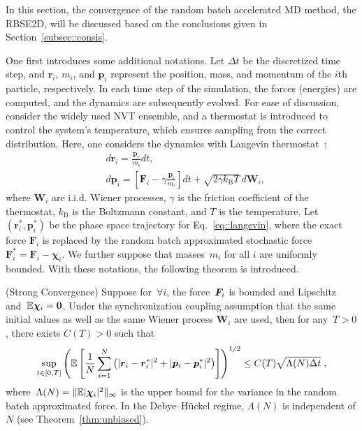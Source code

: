 In this section, the convergence of the random batch accelerated MD method, the RBSE2D, will be discussed based on the conclusions given in Section~\ref{subsec::consis}.

One first introduces some additional notations.
Let $\Delta t$ be the discretized time step, and $\bm{r}_i$, $m_i$, and $\bm{p}_i$ represent the position, mass, and momentum of the $i$th particle, respectively. 
In each time step of the simulation, the forces (energies) are computed, and the dynamics are subsequently evolved. 
For ease of discussion, consider the widely used NVT ensemble, and a thermostat is introduced to control the system's temperature, which ensures sampling from the correct distribution. 
Here, one considers the dynamics with Langevin thermostat~\cite{frenkel2023understanding}:
\begin{equation}\label{eq::langevin}
	\begin{split}
		& d \boldsymbol{r}_i = \frac{\boldsymbol{p}_i}{m_i} d t, \\ 
		& d \boldsymbol{p}_i = \left[\boldsymbol{F}_i - \gamma \frac{\boldsymbol{p}_i}{m_i}\right] d t + \sqrt{2 \gamma k_{\mathrm{B}} T} \, d \boldsymbol{W}_i,
	\end{split}
\end{equation}
where $\boldsymbol{W}_i$ are i.i.d. Wiener processes, $\gamma$ is the friction coefficient of the thermostat, $k_{\mathrm{B}}$ is the Boltzmann constant, and $T$ is the temperature.
Let $(\bm{r}_i^*, \bm{p}_i^*)$ be the phase space trajectory for Eq.~\eqref{eq::langevin}, where the exact force $\bm{F}_i$ is replaced by the random batch approximated stochastic force $\bm{F}_i^*=\bm{F}_i-\bm{\chi}_i$. We further suppose that masses~$m_{i}$ for all $i$ are uniformly bounded.
With these notations, the following theorem is introduced.
\begin{thm} (Strong Convergence)
	Suppose for~$\forall i$, the force~$\boldsymbol{F}_{i}$ is bounded and Lipschitz and~$\mathbb{E} \boldsymbol{\chi}_{i} = \bm 0$. Under the synchronization coupling assumption that the same initial values as well as the same Wiener process $\bm{W}_i$ are used, then for any~$T > 0$, there exists $C(T) > 0$ such that
	\begin{equation}\label{eq::bound}
		\sup_{t\in[0,T]}\left( \mathbb{E} \left[ \frac{1}{N} \sum_{i = 1}^N \left(\lvert\boldsymbol{r}_{i} - \boldsymbol{r}_{i}^*\rvert^2 + \lvert\boldsymbol{p}_{i} - \boldsymbol{p}_{i}^*\rvert^2\right) \right] \right)^{1/2} \leq C(T) \sqrt{\Lambda(N) \Delta t}\;,
	\end{equation}
	where~$\Lambda(N)=\|\mathbb{E} \lvert\boldsymbol{\chi}_{i}\rvert^2\|_{\infty}$ is the upper bound for the variance in the random batch approximated force. In the Debye--H\"uckel regime, $\Lambda(N)$ is independent of $N$ (see Theorem~\ref{thm:unbiased}).
	\label{thm:rbm_consist}
\end{thm}

